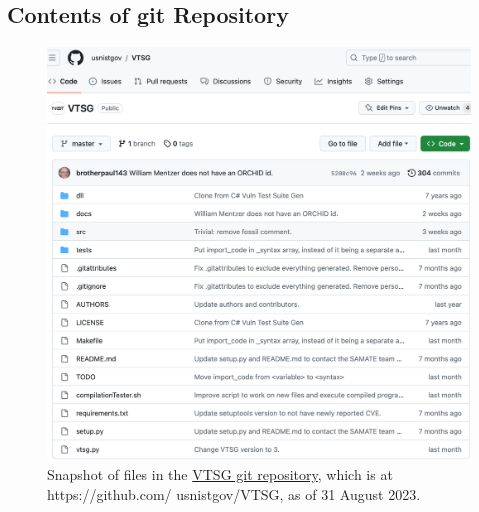 \begin{appendices}
\clearpage

\section{Contents of git Repository}
\label{gitContent}

\begin{figure}[htbp]
  \includegraphics[width=1\linewidth]{fig_git_files.png}
  \caption{Snapshot of files in the
    \href{https://github.com/usnistgov/VTSG}{VTSG git repository}, which is at
    https://github.com/ usnistgov/VTSG,
    as of 31 August 2023.}
  \label{fig:git files}
\end{figure}


\end{appendices}
